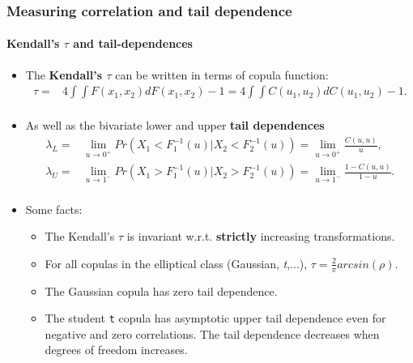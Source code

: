 \documentclass[10pt,aspectratio=169]{beamer}
\begin{document}
\begin{frame}
  \frametitle{Measuring correlation and tail dependence}
  \framesubtitle{Kendall's $\tau$ and tail-dependences}
  \begin{itemize}
  \item The \textbf{Kendall's $\tau$} can be written in terms of copula function:
    \begin{equation*}
      \begin{split}
        \tau = & 4 \int \int F(x_1, x_2)dF(x_1,x_2)-1 = 4 \int \int C(u_1, u_2)dC(u_1,u_2)-1. \\
      \end{split}
    \end{equation*}

  \item As well as the bivariate lower and upper \textbf{tail dependences}
    \begin{equation*}
      \begin{split}
        \lambda_L = & \lim \limits_{u \to 0^{+}} Pr(X_1< F_1^{-1}(u)| X_2<F_2^{-1}(u))= \lim \limits_{u \to 0^{+}} \frac{C(u,u)}{u},\\
        \lambda_U=&\lim \limits_{u \to 1^{-}} Pr(X_1> F_1^{-1}(u)|
        X_2>F_2^{-1}(u))= \lim \limits_{u \to 1^{-}} \frac{1-C(u,u)}{1-u}.\\
      \end{split}
    \end{equation*}

  \item Some facts:
    \begin{itemize}
    \item The Kendall's $\tau$ is invariant w.r.t. \textbf{strictly} increasing transformations.
    \item For all copulas in the elliptical class (Gaussian, \emph{t},...),
      $\tau = \frac{2}{\pi}arcsin(\rho)$.
    \item The Gaussian copula has zero tail dependence.
    \item The  student \texttt{t} copula has asymptotic upper tail dependence even for negative
      and zero correlations. The tail dependence decreases when degrees of
      freedom increases.
    \end{itemize}
  \end{itemize}
\end{frame}
\end{document}
